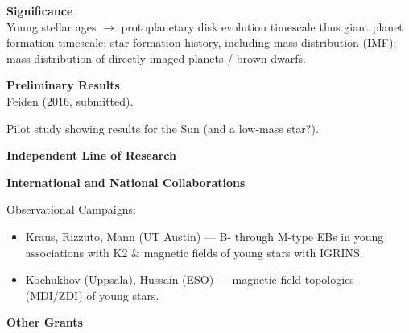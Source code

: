\documentclass[12pt,a4paper]{article}
\begin{document}
{\bf \large Significance} \\
Young stellar ages $\rightarrow$ protoplanetary disk evolution timescale thus giant planet formation timescale; star formation history, including mass distribution (IMF); mass distribution of directly imaged planets / brown dwarfs.

{\bf \large Preliminary Results} \\
Feiden (2016, submitted).

Pilot study showing results for the Sun (and a low-mass star?).

{\bf \large Independent Line of Research}

{\bf \large International and National Collaborations}

Observational Campaigns:
\begin{itemize}
	\item Kraus, Rizzuto, Mann (UT Austin) --- B- through M-type EBs in young associations with K2 \& magnetic fields of young stars with IGRINS.
	\item Kochukhov (Uppsala), Hussain (ESO) --- magnetic field topologies (MDI/ZDI) of young stars.
\end{itemize}

{\bf \large Other Grants}
\end{document}
